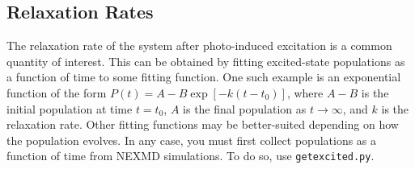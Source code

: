 \documentclass[letterpaper,12pt,titlepage]{article}
\begin{document}
\subsection{Relaxation Rates}
\label{relax_rate}
The relaxation rate of the system after photo-induced excitation is a common quantity of interest.  This can be obtained by fitting excited-state populations as a function of time to some fitting function.  One such example is an exponential function of the form $P\left(t\right)=A-B\exp\left[-k\left(t-t_{0}\right)\right]$, where $A-B$ is the initial population at time $t=t_{0}$, $A$ is the final population as $t\rightarrow\infty$, and $k$ is the relaxation rate.  Other fitting functions may be better-suited depending on how the population evolves.  In any case, you must first collect populations as a function of time from NEXMD simulations.  To do so, use \verb+getexcited.py+.
\end{document}
